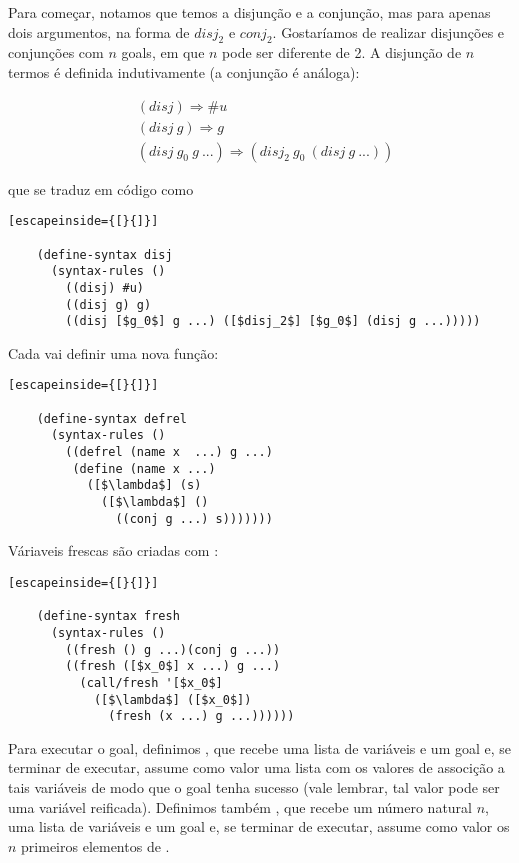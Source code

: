 \documentclass{article}
\begin{document}
  Para começar, notamos que temos a disjunção e a conjunção, mas para
  apenas dois argumentos, na forma de  $disj_2$ e $conj_2$. Gostaríamos
  de realizar disjunções e conjunções com $n$ goals, em que $n$ pode
  ser diferente de 2. A disjunção de $n$ termos é definida
  indutivamente (a conjunção é análoga):

  \begin{align*}
    &(disj) \Rightarrow \#u \\
    &(disj\ g) \Rightarrow g \\
    &(disj\ g_0\ g\ ...) \Rightarrow (disj_2\ g_0\ (disj\ g\ ...))
  \end{align*}

  \noindent que se traduz em código como

  \begin{lstlisting}[escapeinside={[}{]}]

    (define-syntax disj
      (syntax-rules ()
        ((disj) #u)
        ((disj g) g)
        ((disj [$g_0$] g ...) ([$disj_2$] [$g_0$] (disj g ...)))))

  \end{lstlisting}

  Cada  vai definir uma nova função:

  \begin{lstlisting}[escapeinside={[}{]}]

    (define-syntax defrel
      (syntax-rules ()
        ((defrel (name x  ...) g ...)
         (define (name x ...)
           ([$\lambda$] (s)
             ([$\lambda$] ()
               ((conj g ...) s)))))))

  \end{lstlisting}
             
  Váriaveis frescas são criadas com :

  \begin{lstlisting}[escapeinside={[}{]}]

    (define-syntax fresh
      (syntax-rules ()
        ((fresh () g ...)(conj g ...))
        ((fresh ([$x_0$] x ...) g ...)
          (call/fresh '[$x_0$]
            ([$\lambda$] ([$x_0$])
              (fresh (x ...) g ...))))))

  \end{lstlisting}
  
  Para executar o goal, definimos , que recebe uma
  lista de variáveis e um goal e, se terminar de executar, assume como
  valor uma lista com os valores de associção a tais variáveis de modo
  que o goal tenha sucesso (vale lembrar, tal valor pode ser uma
  variável reificada). Definimos também , que recebe
  um número natural $n$, uma lista de variáveis e um goal e, se
  terminar de executar, assume como valor os $n$ primeiros elementos
  de .
\end{document}
